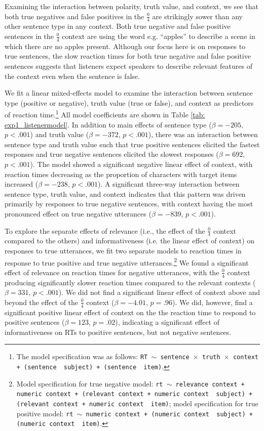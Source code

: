 \documentclass[man, floatsintext, noapacite]{apa6}
\begin{document}
Examining the interaction between polarity, truth value, and context, we see that both true negatives and false positives in the $\frac{0}{4}$ are strikingly sower than any other sentence type in any context. Both true negative and false positive sentences in the $\frac{0}{4}$ context are using the word e.g. ``apples'' to describe a scene in which there are no apples present. Although our focus here is on responses to true sentences, the slow reaction times for both true negative and false positive sentences suggests that listeners expect speakers to describe relevant features of the context even when the sentence is false. 

We fit a linear mixed-effects model to examine the interaction between sentence type (positive or negative), truth value (true or false), and context as predictors of reaction time.\footnote{The model specification was as follows: \texttt{RT $\sim$ sentence~$\times$~truth~$\times$~context + (sentence~\textbar~subject) +  (sentence~\textbar~item)}.} All model coefficients are shown in Table \ref{tab: exp1_listenermodel}. In addition to main effects of sentence type ($\beta= -205$, $p< .001$) and truth value ($\beta= -372$, $p< .001$), there was an interaction between sentence type and truth value such that true positive sentences elicited the fastest responses and true negative sentences elicited the slowest responses ($\beta= 692$, $p< .001$). The model showed a significant negative linear effect of context, with reaction times decreasing as the proportion of characters with target items increased ($\beta= -238$, $p< .001$). A significant three-way interaction between sentence type, truth value, and context indicates that this pattern was driven primarily by responses to true negative sentences, with context having the most pronounced effect on true negative utterances ($\beta= -839$, $p< .001$).  

To explore the separate effects of relevance (i.e., the effect of the $\frac{0}{4}$ context compared to the others) and informativeness (i.e. the linear effect of context) on responses to true utterances, we fit two separate models to reaction times in response to true positive and true negative utterances.\footnote{Model specification for true negative model: \texttt{rt $\sim$  relevance context + numeric context + (relevant context + numeric context~\textbar~subject) +  (relevant context + numeric context~\textbar~item)}; model specification for true positive model: \texttt{rt $\sim$  numeric context + (numeric context~\textbar~subject) +  (numeric context~\textbar~item)}.} We found a significant effect of relevance on reaction times for negative utterances, with the $\frac{0}{4}$ context producing significantly slower reaction times compared to the relevant contexts ($\beta= 331$, $p< .001$). We did not find a significant linear effect of context above and beyond the effect of the  $\frac{0}{4}$ context ($\beta= -4.01$, $p = .96$). We did, however, find a significant positive linear effect of context on the the reaction time to respond to positive sentences ($\beta= 123$, $p = .02$), indicating a significant effect of informativeness on RTs to positive sentences, but not negative sentences. 
\end{document}
